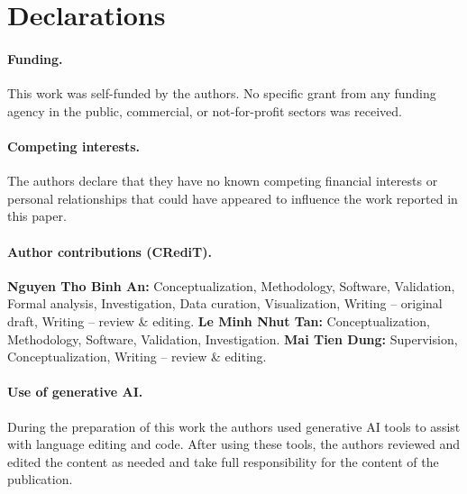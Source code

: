\section*{Declarations}

\paragraph{Funding.}
This work was self-funded by the authors. No specific grant from any funding agency in the public, commercial, or not-for-profit sectors was received.

\paragraph{Competing interests.}
The authors declare that they have no known competing financial interests or personal relationships that could have appeared to influence the work reported in this paper.

\paragraph{Author contributions (CRediT).}
\textbf{Nguyen Tho Binh An:} Conceptualization, Methodology, Software, Validation, Formal analysis, Investigation, Data curation, Visualization, Writing -- original draft, Writing -- review \& editing.
\textbf{Le Minh Nhut Tan:} Conceptualization, Methodology, Software, Validation, Investigation.
\textbf{Mai Tien Dung:} Supervision, Conceptualization, Writing -- review \& editing.

\paragraph{Use of generative AI.}
During the preparation of this work the authors used generative AI tools to assist with language editing and code. After using these tools, the authors reviewed and edited the content as needed and take full responsibility for the content of the publication.
